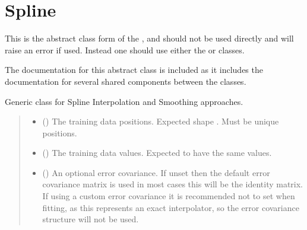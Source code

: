 \documentclass[letterpaper,10pt,english]{sphinxmanual}
\begin{document}
\section{Spline}
\label{\detokenize{splines:spline}}
\sphinxAtStartPar
This is the abstract class form of the , and should not be used directly and will raise an
error if used. Instead one should use either the  or 
classes.

\sphinxAtStartPar
The documentation for this abstract class is included as it includes the documentation for several
shared components between the  classes.

\begin{fulllineitems}
\label{\detokenize{splines:glomar_gridding.spline.Spline}}
\pysigstartsignatures
\pysiglinewithargsret
{}
{\sphinxparamcomma {}\sphinxparamcomma {}}
{}
\pysigstopsignatures
\sphinxAtStartPar
Generic class for Spline Interpolation and Smoothing approaches.

\sphinxAtStartPar
{}
\begin{quote}\begin{description}
\begin{itemize}
\item {}
\sphinxAtStartPar
{} () \textendash{} The training data positions. Expected shape .
Must be unique positions.

\item {}
\sphinxAtStartPar
{} () \textendash{} The training data values. Expected to have the same  values.

\item {}
\sphinxAtStartPar
{} () \textendash{} An optional error covariance. If unset then the default error
covariance matrix is used \sphinxhyphen{} in most cases this will be the identity
matrix. If using a custom error covariance it is recommended not to set
 when fitting, as this represents an exact interpolator, so
the error covariance structure will not be used.


\end{itemize}
\end{description}
\end{quote}
\end{fulllineitems}
\end{document}
